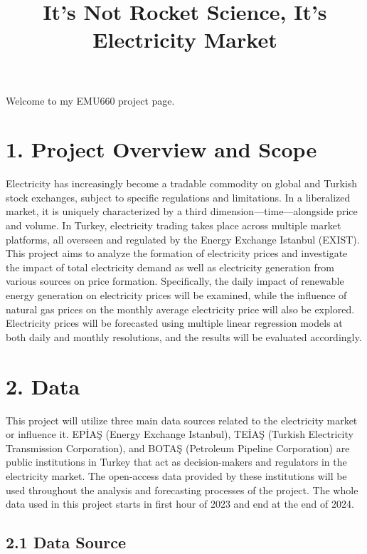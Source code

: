 \documentclass[
]{article}
\title{It's Not Rocket Science, It's Electricity Market}
\author{}
\date{}
\renewcommand*\contentsname{Table of contents}
\newcommand\contentsname{Table of contents}
\begin{document}
\maketitle

\renewcommand*\contentsname{Table of contents}
{
\hypersetup{linkcolor=}
\setcounter{tocdepth}{3}
\tableofcontents
}

Welcome to my EMU660 project page.

\section{1. Project Overview and
Scope}\label{project-overview-and-scope}

Electricity has increasingly become a tradable commodity on global and
Turkish stock exchanges, subject to specific regulations and
limitations. In a liberalized market, it is uniquely characterized by a
third dimension---time---alongside price and volume. In Turkey,
electricity trading takes place across multiple market platforms, all
overseen and regulated by the Energy Exchange Istanbul (EXIST). This
project aims to analyze the formation of electricity prices and
investigate the impact of total electricity demand as well as
electricity generation from various sources on price formation.
Specifically, the daily impact of renewable energy generation on
electricity prices will be examined, while the influence of natural gas
prices on the monthly average electricity price will also be explored.
Electricity prices will be forecasted using multiple linear regression
models at both daily and monthly resolutions, and the results will be
evaluated accordingly.

\section{2. Data}\label{data}

This project will utilize three main data sources related to the
electricity market or influence it. EPİAŞ (Energy Exchange Istanbul),
TEİAŞ (Turkish Electricity Transmission Corporation), and BOTAŞ
(Petroleum Pipeline Corporation) are public institutions in Turkey that
act as decision-makers and regulators in the electricity market. The
open-access data provided by these institutions will be used throughout
the analysis and forecasting processes of the project. The whole data
used in this project starts in first hour of 2023 and end at the end of
2024.

\subsection{2.1 Data Source}\label{data-source}
\end{document}
